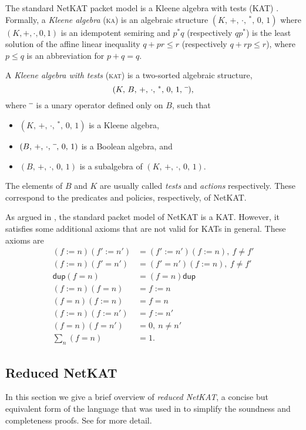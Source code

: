 \documentclass{article}
\renewcommand\star{^*}
\newcommand\KA{\textsc{ka}}
\newcommand\KAT{\textsc{kat}}
\newcommand{\netkat}{NetKAT\xspace}
\newcommand{\kw}[1]{\ensuremath{\mathsf{#1}}}
\newcommand{\pdup}{\ensuremath{\mathrel{\kw{dup}}}}
\begin{document}
The standard \netkat packet model is a Kleene algebra with tests (KAT) \cite{K97c}. Formally, a \emph{Kleene algebra} (\KA) is an algebraic
structure $(K,\,+,\,\cdot,\,\star,\,0,\,1)$
where $(K,+,\cdot,0,1)$ is an idempotent semiring and
$p\star q$ (respectively $qp\star$) is the
least solution of the affine linear inequality
$q + pr \leq r$ (respectively
$q+rp\leq r$), where $p\leq q$ is an abbreviation for
$p+q = q$.  

A \emph{Kleene algebra with tests} (\KAT) is
a two-sorted algebraic structure,
\[
(K,\,B,\,+,\,\cdot,\,\star,\,0,\,1,\,\barnone),
\]
where $\barnone$ is a unary operator defined only on $B$, such that
\begin{itemize}
\item
$(K,\,+,\,\cdot,\,\star ,\,0,\,1)$ is a Kleene algebra,
\item
$(B,\,+,\,\cdot,\,\barnone,\,0,\,1)$ is a Boolean algebra, and
\item
$(B,\,+,\,\cdot,\,0,\,1)$ is a subalgebra of $(K,\,+,\,\cdot,\,0,\,1)$.
\end{itemize}
%
The elements of $B$ and $K$ are usually called \emph{tests}
and \emph{actions} respectively. These correspond to the
predicates and policies, respectively, of \netkat.

As argued in \cite{AFGJKSW13a}, the standard packet model of \netkat is a KAT. However, it satisfies
some additional axioms that are not valid for KATs in general. These axioms are
\begin{align*}
(f := n)(f' := n') &= (f' := n')(f := n),\ f\neq f'\\
(f := n)(f' = n') &= (f' = n')(f := n),\ f\neq f'\\
\pdup(f = n) &= (f = n)\pdup\\
(f := n)(f = n) &= f := n\\
(f = n)(f := n) &= f = n\\
(f := n)(f := n') &= f := n'\\
(f = n)(f = n') &= 0,\ n\neq n'\\
\sum_n (f=n) &= 1.
\end{align*}

\subsection{Reduced \netkat}
\label{sec:reduced}

In this section we give a brief overview of \emph{reduced \netkat}, a
concise but equivalent form of the language that was used in \cite{AFGJKSW13a} to
simplify the soundness and completeness proofs.
See \cite{AFGJKSW13a} for more detail.
\end{document}
